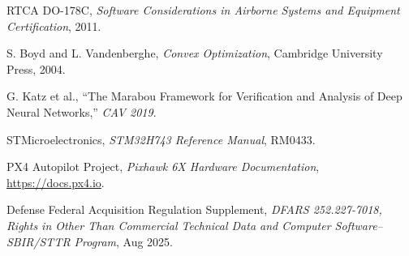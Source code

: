 \documentclass[11pt,oneside]{article}
\begin{document}
\begin{enumerate}[nosep,label={[\arabic*]}]
    \item RTCA DO-178C, \textit{Software Considerations in Airborne Systems and Equipment Certification}, 2011.
    \item S. Boyd and L. Vandenberghe, \textit{Convex Optimization}, Cambridge University Press, 2004.
    \item G. Katz et al., ``The Marabou Framework for Verification and Analysis of Deep Neural Networks,'' \textit{CAV 2019}.
    \item STMicroelectronics, \textit{STM32H743 Reference Manual}, RM0433.
    \item PX4 Autopilot Project, \textit{Pixhawk 6X Hardware Documentation}, \url{https://docs.px4.io}.
    \item Defense Federal Acquisition Regulation Supplement, \textit{DFARS 252.227-7018, Rights in Other Than Commercial Technical Data and Computer Software--SBIR/STTR Program}, Aug 2025.
\end{enumerate}
\end{document}
